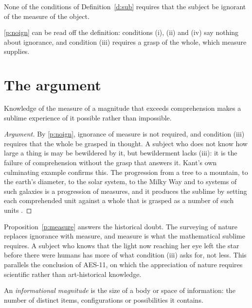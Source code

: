 \documentclass{situationist-preprint}
\begin{document}
\begin{principle}\label{p:noign}
None of the conditions of Definition~\ref{d:sub} requires that the subject be ignorant of the measure of the object.
\end{principle}

\ref{p:noign} can be read off the definition: conditions (i), (ii) and (iv) say nothing about ignorance, and condition (iii) requires a grasp of the whole, which measure supplies.

\section{The argument}

\begin{proposition}\label{p:measure}
Knowledge of the measure of a magnitude that exceeds comprehension makes a sublime experience of it possible rather than impossible.
\end{proposition}

\begin{proof}[Argument]
By \ref{p:noign}, ignorance of measure is not required, and condition (iii) requires that the whole be grasped in thought. A subject who does not know how large a thing is may be bewildered by it, but bewilderment lacks (iii): it is the failure of comprehension without the grasp that answers it. Kant's own culminating example confirms this. The progression from a tree to a mountain, to the earth's diameter, to the solar system, to the Milky Way and to systems of such galaxies is a progression of measures, and it produces the sublime by setting each comprehended unit against a whole that is grasped as a number of such units \citep[\S 26]{Kant1790}.
\end{proof}

Proposition~\ref{p:measure} answers the historical doubt. The surveying of nature replaces ignorance with measure, and measure is what the mathematical sublime requires. A subject who knows that the light now reaching her eye left the star before there were humans has more of what condition (iii) asks for, not less. This parallels the conclusion of AES-11, on which the appreciation of nature requires scientific rather than art-historical knowledge.

\begin{definition}\label{d:info}
An \emph{informational magnitude} is the size of a body or space of information: the number of distinct items, configurations or possibilities it contains.
\end{definition}
\end{document}
